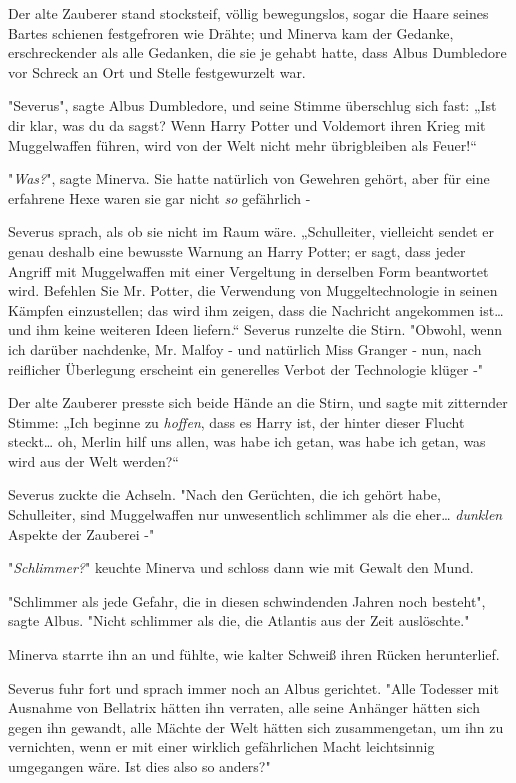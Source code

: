 {Der alte Zauberer stand stocksteif, völlig bewegungslos, sogar die Haare seines Bartes schienen festgefroren wie Drähte; und Minerva kam der Gedanke, erschreckender als alle Gedanken, die sie je gehabt hatte, dass Albus Dumbledore vor Schreck an Ort und Stelle festgewurzelt war.

"Severus", sagte Albus Dumbledore, und seine Stimme überschlug sich fast: „Ist dir klar, was du da sagst? Wenn Harry Potter und Voldemort ihren Krieg mit Muggelwaffen führen, wird von der Welt nicht mehr übrigbleiben als Feuer!“

"\emph{Was?}", sagte Minerva. Sie hatte natürlich von Gewehren gehört, aber für eine erfahrene Hexe waren sie gar nicht \emph{so} gefährlich -

Severus sprach, als ob sie nicht im Raum wäre. „Schulleiter, vielleicht sendet er genau deshalb eine bewusste Warnung an Harry Potter; er sagt, dass jeder Angriff mit Muggelwaffen mit einer Vergeltung in derselben Form beantwortet wird. Befehlen Sie Mr. Potter, die Verwendung von Muggeltechnologie in seinen Kämpfen einzustellen; das wird ihm zeigen, dass die Nachricht angekommen ist… und ihm keine weiteren Ideen liefern.“ Severus runzelte die Stirn. "Obwohl, wenn ich darüber nachdenke, Mr. Malfoy - und natürlich Miss Granger - nun, nach reiflicher Überlegung erscheint ein generelles Verbot der Technologie klüger -"

Der alte Zauberer presste sich beide Hände an die Stirn, und sagte mit zitternder Stimme: „Ich beginne zu \emph{hoffen}, dass es Harry ist, der hinter dieser Flucht steckt… oh, Merlin hilf uns allen, was habe ich getan, was habe ich getan, was wird aus der Welt werden?“

Severus zuckte die Achseln. "Nach den Gerüchten, die ich gehört habe, Schulleiter, sind Muggelwaffen nur unwesentlich schlimmer als die eher… \emph{dunklen} Aspekte der Zauberei -"

"\emph{Schlimmer?}" keuchte Minerva und schloss dann wie mit Gewalt den Mund.

"Schlimmer als jede Gefahr, die in diesen schwindenden Jahren noch besteht", sagte Albus. "Nicht schlimmer als die, die Atlantis aus der Zeit auslöschte."

Minerva starrte ihn an und fühlte, wie kalter Schweiß ihren Rücken herunterlief.

Severus fuhr fort und sprach immer noch an Albus gerichtet. "Alle Todesser mit Ausnahme von Bellatrix hätten ihn verraten, alle seine Anhänger hätten sich gegen ihn gewandt, alle Mächte der Welt hätten sich zusammengetan, um ihn zu vernichten, wenn er mit einer wirklich gefährlichen Macht leichtsinnig umgegangen wäre. Ist dies also so anders?"

}

